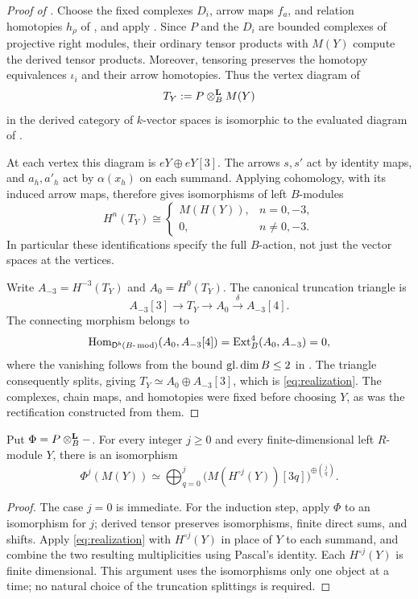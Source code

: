 \begin{proof}[Proof of ]
Choose the fixed complexes \(D_i\), arrow maps \(f_a\), and relation
homotopies \(h_\rho\) of , and apply
.  Since \(P\) and the \(D_i\) are bounded
complexes of projective right modules, their ordinary tensor
products with \(M(Y)\) compute the derived tensor products.
Moreover, tensoring preserves the homotopy equivalences \(\iota_i\)
and their arrow homotopies.  Thus the vertex diagram of
\[
 T_Y:=P\otimes^{\mathbf L}_B M(Y)
\]
in the derived category of \(k\)-vector spaces is isomorphic to the
evaluated diagram of .

At each vertex this diagram is \(eY\oplus eY[3]\).  The arrows
\(s,s'\) act by identity maps, and \(a_h,a'_h\) act by
\(\alpha(x_h)\) on each summand.  Applying cohomology, with its
induced arrow maps, therefore gives isomorphisms of left
\(B\)-modules
\[
 H^n(T_Y)\cong
 \begin{cases}
  M(H(Y)),& n=0,-3,\\
  0,& n\ne0,-3.
 \end{cases}
\]
In particular these identifications specify the full \(B\)-action,
not just the vector spaces at the vertices.

Write \(A_{-3}=H^{-3}(T_Y)\) and \(A_0=H^0(T_Y)\).
The canonical truncation triangle is
\[
 A_{-3}[3]\longrightarrow T_Y\longrightarrow A_0
 \xrightarrow{\ \delta\ } A_{-3}[4].
\]
The connecting morphism belongs to
\[
 \operatorname{Hom}_{\mathsf D^b(B\text{-}\operatorname{mod})}(A_0,A_{-3}[4])
   =\operatorname{Ext}_B^4(A_0,A_{-3})=0,
\]
where the vanishing follows from the bound
\(\operatorname{gl.dim} B\leq2\) in .
The triangle consequently splits, giving
\(T_Y\simeq A_0\oplus A_{-3}[3]\), which is
\eqref{eq:realization}.
The complexes, chain maps, and homotopies were fixed before choosing
\(Y\), as was the rectification constructed from them.
\end{proof}

\begin{corollary}
Put \(\Phi=P\otimes^{\mathbf L}_B-\).  For every integer \(j\geq0\) and every
finite-dimensional left \(R\)-module \(Y\), there is an isomorphism
\[
 \Phi^j(M(Y))
 \simeq
 \bigoplus_{q=0}^j
   \bigl(M(H^{\circ j}(Y))[3q]\bigr)^{\oplus\binom{j}{q}} .
\]
\end{corollary}

\begin{proof}
The case \(j=0\) is immediate.  For the induction step, apply
\(\Phi\) to an isomorphism for \(j\); derived tensor preserves
isomorphisms, finite direct sums, and shifts.  Apply
\eqref{eq:realization} with \(H^{\circ j}(Y)\) in place of \(Y\) to each
summand, and combine the two resulting multiplicities using
Pascal's identity.  Each \(H^{\circ j}(Y)\) is finite dimensional.
This argument uses the isomorphisms only one object at a time;
no natural choice of the truncation splittings is required.
\end{proof}
